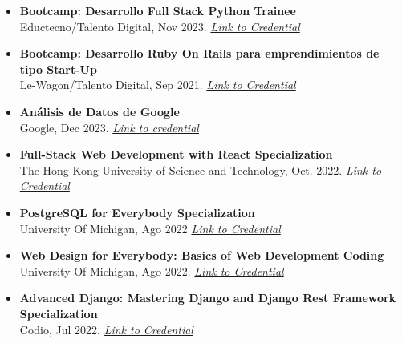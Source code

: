 \documentclass[a4paper,10pt]{article}
\begin{document}
	\begin{itemize}[left=0pt]
		
		\item \textbf{Bootcamp: Desarrollo Full Stack Python Trainee} \\
		Eductecno/Talento Digital, Nov 2023. \textit{\href{https://www.acreditta.com/credential/1654395b-6317-44bf-9beb-18774afdb129}{Link to Credential}}			
		
		
		\item \textbf{Bootcamp: Desarrollo Ruby On Rails para emprendimientos de tipo Start-Up} \\
		Le-Wagon/Talento Digital, Sep 2021.
		\textit{\href{https://portfolio-mparraf.herokuapp.com/static/shared/Emprendimiento web.pdf}{Link to Credential}}	
		
		\vspace{0.2cm} %
		
		\item \textbf{Análisis de Datos de Google} \\
		Google, Dec 2023.
		\textit{\href{https://portfolio-mparraf.herokuapp.com/static/shared/AnalisisDatosGoogle.pdf}{Link to credential}}
		
		\item \textbf{Full-Stack Web Development with React Specialization} \\
		The Hong Kong University of Science and Technology, Oct. 2022.
		\textit{\href{https://portfolio-mparraf.herokuapp.com/static/shared/Full-Stack Web Development with React.pdf}{Link to Credential}}
		
		
		\item \textbf{PostgreSQL for Everybody Specialization} \\
		University Of Michigan, Ago  2022
		\textit{\href{https://portfolio-mparraf.herokuapp.com/static/shared/PostgreSQL for Everybody Specialization.pdf}{Link to Credential}}
		
		\item \textbf{Web Design for Everybody: Basics of Web Development  Coding} \\
		University Of Michigan, Ago 2022.
		\textit{\href{https://portfolio-mparraf.herokuapp.com/static/shared/Web Design for Everybody Specialization.pdf}{Link to Credential}}
		
		\item \textbf{Advanced Django: Mastering Django and Django Rest Framework Specialization} \\
		Codio, Jul 2022.
		\textit{\href{https://portfolio-mparraf.herokuapp.com/static/shared/Advanced Django Mastering Specialization.pdf}{Link to Credential}}
		

\end{itemize}
\end{document}
